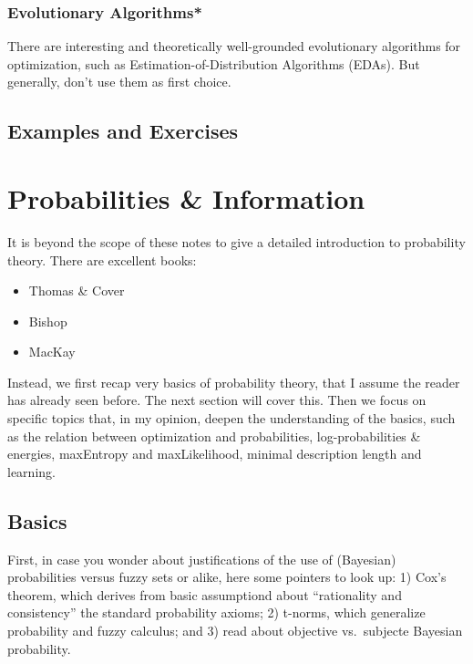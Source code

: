 \subsubsection{Evolutionary Algorithms*}

There are interesting and theoretically well-grounded evolutionary
algorithms for optimization, such as Estimation-of-Distribution
Algorithms (EDAs). But generally, don't use them as first choice.

\subsection{Examples and Exercises}








\section{Probabilities \& Information}

It is beyond the scope of these notes to give a detailed introduction
to probability theory. There are excellent books:
\begin{itemize}
\item Thomas \& Cover
\item Bishop
\item MacKay
\end{itemize}

Instead, we first recap very basics of probability theory, that I
assume the reader has already seen before. The next section will cover
this. Then we focus on specific topics that, in my opinion, deepen the
understanding of the basics, such as the relation between optimization
and probabilities, log-probabilities \& energies, maxEntropy and
maxLikelihood, minimal description length and learning.

\subsection{Basics}

First, in case you wonder about justifications of the use of
(Bayesian) probabilities versus fuzzy sets or alike, here some
pointers to look up: 1) Cox's theorem, which derives from basic
assumptiond about ``rationality and consistency'' the standard
probability axioms; 2) t-norms, which generalize probability and fuzzy
calculus; and 3) read about objective vs.\ subjecte Bayesian
probability.

